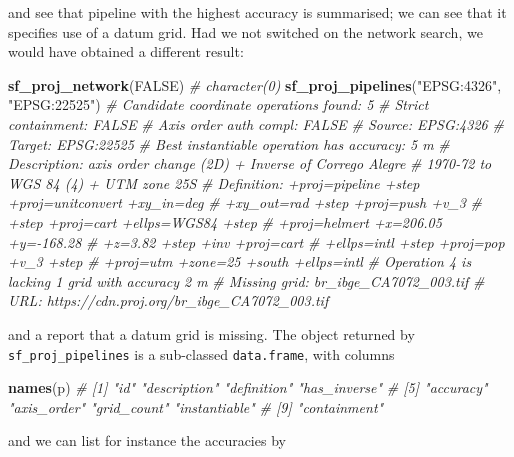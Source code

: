 \documentclass[]{book}
\newenvironment{Shaded}{\begin{snugshade}}{\end{snugshade}}
\newcommand{\CommentTok}[1]{\textcolor[rgb]{0.56,0.35,0.01}{\textit{#1}}}
\newcommand{\KeywordTok}[1]{\textcolor[rgb]{0.13,0.29,0.53}{\textbf{#1}}}
\newcommand{\NormalTok}[1]{#1}
\newcommand{\OperatorTok}[1]{\textcolor[rgb]{0.81,0.36,0.00}{\textbf{#1}}}
\newcommand{\OtherTok}[1]{\textcolor[rgb]{0.56,0.35,0.01}{#1}}
\newcommand{\StringTok}[1]{\textcolor[rgb]{0.31,0.60,0.02}{#1}}
\begin{document}
and see that pipeline with the highest accuracy is summarised; we
can see that it specifies use of a datum grid. Had we not switched
on the network search, we would have obtained a different result:

\begin{Shaded}
\begin{Highlighting}[]
\KeywordTok{sf_proj_network}\NormalTok{(}\OtherTok{FALSE}\NormalTok{)}
\CommentTok{# character(0)}
\KeywordTok{sf_proj_pipelines}\NormalTok{(}\StringTok{"EPSG:4326"}\NormalTok{, }\StringTok{"EPSG:22525"}\NormalTok{)}
\CommentTok{# Candidate coordinate operations found:  5 }
\CommentTok{# Strict containment:     FALSE }
\CommentTok{# Axis order auth compl:  FALSE }
\CommentTok{# Source:  EPSG:4326 }
\CommentTok{# Target:  EPSG:22525 }
\CommentTok{# Best instantiable operation has accuracy: 5 m}
\CommentTok{# Description: axis order change (2D) + Inverse of Corrego Alegre}
\CommentTok{#              1970-72 to WGS 84 (4) + UTM zone 25S}
\CommentTok{# Definition:  +proj=pipeline +step +proj=unitconvert +xy_in=deg}
\CommentTok{#              +xy_out=rad +step +proj=push +v_3}
\CommentTok{#              +step +proj=cart +ellps=WGS84 +step}
\CommentTok{#              +proj=helmert +x=206.05 +y=-168.28}
\CommentTok{#              +z=3.82 +step +inv +proj=cart}
\CommentTok{#              +ellps=intl +step +proj=pop +v_3 +step}
\CommentTok{#              +proj=utm +zone=25 +south +ellps=intl}
\CommentTok{# Operation 4 is lacking 1 grid with accuracy 2 m}
\CommentTok{# Missing grid: br_ibge_CA7072_003.tif }
\CommentTok{# URL: https://cdn.proj.org/br_ibge_CA7072_003.tif}
\end{Highlighting}
\end{Shaded}

and a report that a datum grid is missing.
The object returned by \texttt{sf\_proj\_pipelines} is a sub-classed \texttt{data.frame}, with columns

\begin{Shaded}
\begin{Highlighting}[]
\KeywordTok{names}\NormalTok{(p)}
\CommentTok{# [1] "id"           "description"  "definition"   "has_inverse" }
\CommentTok{# [5] "accuracy"     "axis_order"   "grid_count"   "instantiable"}
\CommentTok{# [9] "containment"}
\end{Highlighting}
\end{Shaded}

and we can list for instance the accuracies by

\begin{Shaded}
\end{Shaded}
\end{document}
